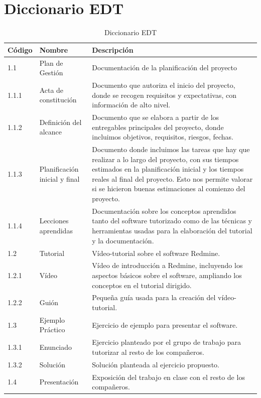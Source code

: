 \documentclass[a4paper,10pt]{scrartcl}
\begin{document}
\section{Diccionario EDT}

\begin{table}[H]
	\centering
	\caption{Diccionario EDT}
	\label{my-label}
	\resizebox{15cm}{!} {
	\begin{tabular}{|l|l|l|}
		\hline
		Código & Nombre          & Descripción                                    \\ \hline
		1.1    & Plan de Gestión & Documentación de la planificación del proyecto \\ \hline
		1.1.1  & Acta de constitución & Documento que autoriza el inicio del proyecto, donde se recogen requisitos y expectativas, con información de alto nivel.   \\ \hline
		1.1.2  & Definición del alcance & Documento que se elabora a partir de los entregables principales del proyecto, donde incluimos objetivos, requisitos, riesgos, fechas. \\ \hline
		1.1.3  & Planificación inicial y final & Documento donde incluimos las tareas que hay que realizar a lo largo del proyecto, con sus tiempos estimados en la planificación inicial y los tiempos reales al final del proyecto. Esto nos permite valorar si se hicieron buenas estimaciones al comienzo del proyecto.  \\ \hline
		1.1.4  & Lecciones aprendidas & Documentación sobre los conceptos aprendidos tanto del software tutorizado como de las técnicas y herramientas usadas para la elaboración del tutorial y la documentación. \\ \hline
		1.2    & Tutorial & Vídeo-tutorial sobre el software Redmine. \\ \hline
		1.2.1  & Vídeo & Vídeo de introducción a Redmine, incluyendo los aspectos básicos sobre el software, ampliando los conceptos en el tutorial dirigido. \\ \hline
		1.2.2  & Guión & Pequeña guía usada para la creación del vídeo-tutorial. \\ \hline
		1.3    & Ejemplo Práctico & Ejercicio de ejemplo para presentar el software. \\ \hline
		1.3.1  & Enunciado & Ejercicio planteado por el grupo de trabajo para tutorizar al resto de los compañeros. \\ \hline
		1.3.2  & Solución & Solución planteada al ejercicio propuesto. \\ \hline
		1.4    & Presentación & Exposición del trabajo en clase con el resto de los compañeros. \\ \hline

\end{tabular}}
\end{table}
\end{document}
